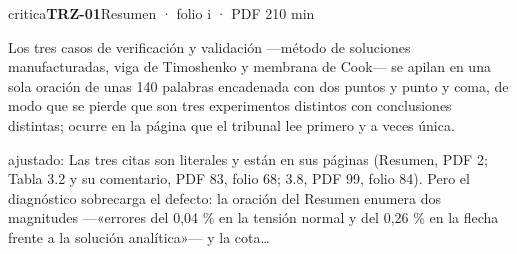 \begin{ficha}{critica}{\casilla\textbf{TRZ-01}\quad{}\quad Resumen · folio i · PDF 2\hfill 10 min}
{\small\color{gris}Los tres casos de verificación y validación —método de soluciones manufacturadas, viga de Timoshenko y membrana de Cook— se apilan en una sola oración de unas 140 palabras encadenada con dos puntos y punto y coma, de modo que se pierde que son tres experimentos distintos con conclusiones distintas; ocurre en la página que el tribunal lee primero y a veces única.\par}
{\footnotesize\color{gris}ajustado: Las tres citas son literales y están en sus páginas (Resumen, PDF 2; Tabla 3.2 y su comentario, PDF 83, folio 68; 3.8, PDF 99, folio 84). Pero el diagnóstico sobrecarga el defecto: la oración del Resumen enumera dos magnitudes —«errores del 0,04 \% en la tensión normal y del 0,26 \% en la flecha frente a la solución analítica»— y la cota…\par}
\end{ficha}
